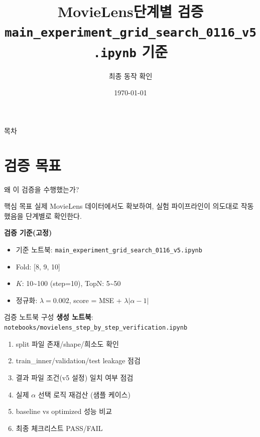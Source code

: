 \documentclass[aspectratio=169,10pt]{beamer}
\title[MovieLens Verification]{MovieLens단계별 검증 \\
\small \texttt{main\_experiment\_grid\_search\_0116\_v5.ipynb} 기준}
\subtitle{최종 동작 확인}
\author[발표자]{}
\institute{}
\date{\today}
\begin{document}
\begin{frame}
  \titlepage
\end{frame}

\begin{frame}{목차}
  \tableofcontents[hideallsubsections]
\end{frame}

\section{검증 목표}

\begin{frame}{왜 이 검증을 수행했는가?}
  \begin{block}{핵심 목표}
    실제 MovieLens 데이터에서도 확보하여,
    실험 파이프라인이 의도대로 작동했음을 단계별로 확인한다.
  \end{block}

  \vspace{0.4em}
  \textbf{검증 기준(고정)}
  \begin{itemize}
    \item 기준 노트북: \texttt{main\_experiment\_grid\_search\_0116\_v5.ipynb}
    \item Fold: [8, 9, 10]
    \item \(K\): 10\textasciitilde100 (step=10), TopN: 5\textasciitilde50
    \item 정규화: \(\lambda = 0.002\), score = MSE + \(\lambda|\alpha-1|\)
  \end{itemize}
\end{frame}

\begin{frame}{검증 노트북 구성}
  \textbf{생성 노트북}: \texttt{notebooks/movielens\_step\_by\_step\_verification.ipynb}

  \vspace{0.4em}
  \begin{enumerate}
    \item split 파일 존재/shape/희소도 확인
    \item train\_inner/validation/test leakage 점검
    \item 결과 파일 조건(v5 설정) 일치 여부 점검
    \item 실제 \(\alpha\) 선택 로직 재검산 (샘플 케이스)
    \item baseline vs optimized 성능 비교
    \item 최종 체크리스트 PASS/FAIL
  \end{enumerate}
\end{frame}
\end{document}
